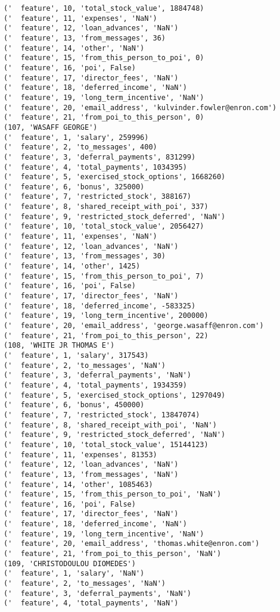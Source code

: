 \begin{verbatim}
('  feature', 10, 'total_stock_value', 1884748)
('  feature', 11, 'expenses', 'NaN')
('  feature', 12, 'loan_advances', 'NaN')
('  feature', 13, 'from_messages', 36)
('  feature', 14, 'other', 'NaN')
('  feature', 15, 'from_this_person_to_poi', 0)
('  feature', 16, 'poi', False)
('  feature', 17, 'director_fees', 'NaN')
('  feature', 18, 'deferred_income', 'NaN')
('  feature', 19, 'long_term_incentive', 'NaN')
('  feature', 20, 'email_address', 'kulvinder.fowler@enron.com')
('  feature', 21, 'from_poi_to_this_person', 0)
(107, 'WASAFF GEORGE')
('  feature', 1, 'salary', 259996)
('  feature', 2, 'to_messages', 400)
('  feature', 3, 'deferral_payments', 831299)
('  feature', 4, 'total_payments', 1034395)
('  feature', 5, 'exercised_stock_options', 1668260)
('  feature', 6, 'bonus', 325000)
('  feature', 7, 'restricted_stock', 388167)
('  feature', 8, 'shared_receipt_with_poi', 337)
('  feature', 9, 'restricted_stock_deferred', 'NaN')
('  feature', 10, 'total_stock_value', 2056427)
('  feature', 11, 'expenses', 'NaN')
('  feature', 12, 'loan_advances', 'NaN')
('  feature', 13, 'from_messages', 30)
('  feature', 14, 'other', 1425)
('  feature', 15, 'from_this_person_to_poi', 7)
('  feature', 16, 'poi', False)
('  feature', 17, 'director_fees', 'NaN')
('  feature', 18, 'deferred_income', -583325)
('  feature', 19, 'long_term_incentive', 200000)
('  feature', 20, 'email_address', 'george.wasaff@enron.com')
('  feature', 21, 'from_poi_to_this_person', 22)
(108, 'WHITE JR THOMAS E')
('  feature', 1, 'salary', 317543)
('  feature', 2, 'to_messages', 'NaN')
('  feature', 3, 'deferral_payments', 'NaN')
('  feature', 4, 'total_payments', 1934359)
('  feature', 5, 'exercised_stock_options', 1297049)
('  feature', 6, 'bonus', 450000)
('  feature', 7, 'restricted_stock', 13847074)
('  feature', 8, 'shared_receipt_with_poi', 'NaN')
('  feature', 9, 'restricted_stock_deferred', 'NaN')
('  feature', 10, 'total_stock_value', 15144123)
('  feature', 11, 'expenses', 81353)
('  feature', 12, 'loan_advances', 'NaN')
('  feature', 13, 'from_messages', 'NaN')
('  feature', 14, 'other', 1085463)
('  feature', 15, 'from_this_person_to_poi', 'NaN')
('  feature', 16, 'poi', False)
('  feature', 17, 'director_fees', 'NaN')
('  feature', 18, 'deferred_income', 'NaN')
('  feature', 19, 'long_term_incentive', 'NaN')
('  feature', 20, 'email_address', 'thomas.white@enron.com')
('  feature', 21, 'from_poi_to_this_person', 'NaN')
(109, 'CHRISTODOULOU DIOMEDES')
('  feature', 1, 'salary', 'NaN')
('  feature', 2, 'to_messages', 'NaN')
('  feature', 3, 'deferral_payments', 'NaN')
('  feature', 4, 'total_payments', 'NaN')

\end{verbatim}
